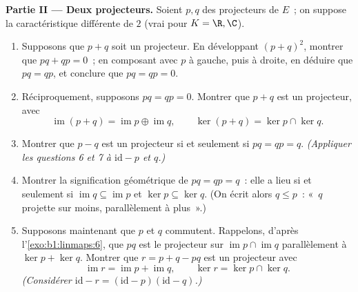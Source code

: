 \begin{problem}
\medskip
\noindent\textbf{Partie II --- Deux projecteurs.} Soient $p, q$ des
projecteurs de $E$~; on suppose la caractéristique différente de $2$ (vrai
pour $K = \R, \C$).
\begin{enumerate}[resume]
  \item Supposons que $p + q$ soit un projecteur. En développant $(p + q)^2$,
        montrer que $pq + qp = 0$~; en composant avec $p$ à gauche, puis
        à droite, en déduire que $pq = qp$, et conclure que $pq = qp =
        0$.
  \item Réciproquement, supposons $pq = qp = 0$. Montrer que $p + q$ est un
        projecteur, avec
        \[
        \operatorname{im}(p + q) = \operatorname{im} p \oplus
        \operatorname{im} q,
        \qquad
        \ker(p + q) = \ker p \cap \ker q .
        \]
  \item Montrer que $p - q$ est un projecteur si et seulement si $pq = qp
        = q$. \emph{(Appliquer les questions 6 et 7 à $\mathrm{id} - p$
        et $q$.)}
  \item Montrer la signification géométrique de $pq = qp = q$~: elle a lieu si
        et seulement si $\operatorname{im} q \subseteq
        \operatorname{im} p$ et $\ker p \subseteq \ker q$. (On
        écrit alors $q \leq p$~: «~$q$ projette sur moins, parallèlement à
        plus~».)
  \item Supposons maintenant que $p$ et $q$ commutent. Rappelons, d'après
        l'\cref{exo:b1:linmaps:6}, que $pq$ est le projecteur sur
        $\operatorname{im} p \cap \operatorname{im} q$ parallèlement à
        $\ker p + \ker q$. Montrer que $r = p + q - pq$ est un
        projecteur avec
        \[
        \operatorname{im} r = \operatorname{im} p +
        \operatorname{im} q,
        \qquad
        \ker r = \ker p \cap \ker q .
        \]
        \emph{(Considérer $\mathrm{id} - r = (\mathrm{id} -
        p)(\mathrm{id} - q)$.)}
\end{enumerate}


\end{problem}
